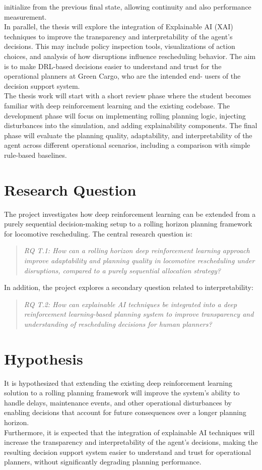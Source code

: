 \documentclass[a4paper]{scrartcl}
\begin{document}
initialize from the previous final state, allowing continuity and also performance
measurement.\\
In parallel, the thesis will explore the integration of Explainable AI (XAI) techniques to
improve the transparency and interpretability of the agent’s decisions. This may include
policy inspection tools, visualizations of action choices, and analysis of how disruptions
influence rescheduling behavior. The aim is to make DRL-based decisions easier to
understand and trust for the operational planners at Green Cargo, who are the intended end-
users of the decision support system.\\
The thesis work will start with a short review phase where the student becomes familiar with
deep reinforcement learning and the existing codebase. The development phase will focus on
implementing rolling planning logic, injecting disturbances into the simulation, and adding
explainability components. The final phase will evaluate the planning quality, adaptability,
and interpretability of the agent across different operational scenarios, including a
comparison with simple rule-based baselines.

\section{Research Question}
The project investigates how deep reinforcement learning can be extended from a purely sequential decision-making setup to a rolling horizon planning framework for locomotive rescheduling. The central research question is:
\begin{quote}\emph{RQ T.1: How can a rolling horizon deep reinforcement learning approach improve adaptability and planning quality in locomotive rescheduling under disruptions, compared to a purely sequential allocation strategy?}\end{quote}
In addition, the project explores a secondary question related to interpretability:
\begin{quote}\emph{RQ T.2: How can explainable AI techniques be integrated into a deep reinforcement learning-based planning system to improve transparency and understanding of rescheduling decisions for human planners?}\end{quote}


\section{Hypothesis}
It is hypothesized that extending the existing deep reinforcement learning solution to a rolling planning framework will improve the system’s ability to handle delays, maintenance events, and other operational disturbances by enabling decisions that account for future consequences over a longer planning horizon.\\
Furthermore, it is expected that the integration of explainable AI techniques will increase the transparency and interpretability of the agent’s decisions, making the resulting decision support system easier to understand and trust for operational planners, without significantly degrading planning performance.
\end{document}
